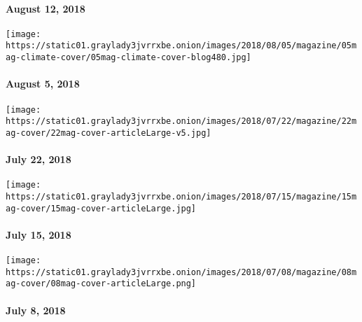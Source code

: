 \hypertarget{august-12-2018}{%
\paragraph{August 12, 2018}\label{august-12-2018}}

\href{https://www.nytimes3xbfgragh.onion/interactive/2018/08/01/magazine/climate-change-losing-earth.html}{}

\texttt{[image: https://static01.graylady3jvrrxbe.onion/images/2018/08/05/magazine/05mag-climate-cover/05mag-climate-cover-blog480.jpg]}

\hypertarget{august-5-2018}{%
\paragraph{August 5, 2018}\label{august-5-2018}}

\href{https://www.nytimes3xbfgragh.onion/issue/magazine/2018/07/20/the-72218-issue}{}

\texttt{[image: https://static01.graylady3jvrrxbe.onion/images/2018/07/22/magazine/22mag-cover/22mag-cover-articleLarge-v5.jpg]}

\hypertarget{july-22-2018}{%
\paragraph{July 22, 2018}\label{july-22-2018}}

\href{https://www.nytimes3xbfgragh.onion/issue/magazine/2018/07/17/the-71518-issue}{}

\texttt{[image: https://static01.graylady3jvrrxbe.onion/images/2018/07/15/magazine/15mag-cover/15mag-cover-articleLarge.jpg]}

\hypertarget{july-15-2018}{%
\paragraph{July 15, 2018}\label{july-15-2018}}

\href{https://www.nytimes3xbfgragh.onion/issue/magazine/2018/07/10/the-7818-issue}{}

\texttt{[image: https://static01.graylady3jvrrxbe.onion/images/2018/07/08/magazine/08mag-cover/08mag-cover-articleLarge.png]}

\hypertarget{july-8-2018}{%
\paragraph{July 8, 2018}\label{july-8-2018}}


